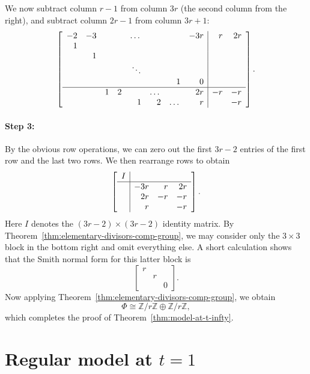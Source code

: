 \documentclass[reqno]{amsart}
\theoremstyle{definition}
\theoremstyle{remark}
\def\Z{\mathbb{Z}}
\def\isom{\cong}
\begin{document}
We now subtract column $r-1$ from column $3r$ (the second column from the right), and subtract column $2r-1$ from column $3r+1$:
\[
\left[\begin{array}{rrrrrrrr|rr}
  -2 & -3 & & & \dots & & & -3r & r & 2r \\
  1 & & & & & & & & & \\
  & 1 & & & & & & & & \\
  & & & & \ddots & & & & & \\
  & & & & & & 1 & 0 & & \\ \hline
  & & 1 & 2 & & \dots & & 2r & -r & -r \\
  & & & & 1 & 2 & \dots & r & & -r
\end{array}\right].
\]

\paragraph{Step 3:}
\label{sec:step-3}

By the obvious row operations, we can zero out the first $3r-2$ entries of the first row and the last two rows. We then rearrange rows to obtain
\[
\left[\begin{array}{c|rrr}
  I & & & \\ \hline
  & -3r & r & 2r \\
  & 2r & -r & -r \\
  & r & & -r
\end{array}\right].
\]
Here $I$ denotes the $(3r-2) \times (3r-2)$ identity matrix. By Theorem~\ref{thm:elementary-divisors-comp-group}, we may consider only the $3 \times 3$ block in the bottom right and omit everything else. A short calculation shows that the Smith normal form for this latter block is
\[
\begin{bmatrix}
  r & & \\
  & r & \\
  & & 0
\end{bmatrix}.
\]
Now applying Theorem~\ref{thm:elementary-divisors-comp-group}, we obtain
  \[
  \Phi \isom {\Z}/{r\Z} \oplus {\Z}/{r\Z},
  \]
which completes the proof of Theorem~\ref{thm:model-at-t-infty}.


\section{Regular model at $t=1$}
\label{sec:regular-model-at-t-equals-one}
\end{document}
